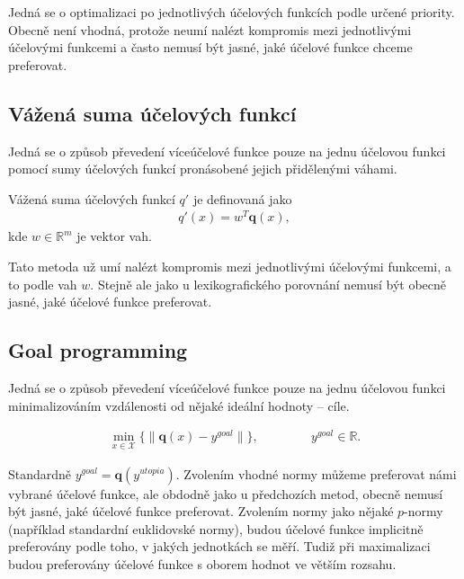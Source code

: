 Jedná se o optimalizaci po jednotlivých účelových funkcích podle určené priority. 
Obecně není vhodná, protože neumí nalézt kompromis mezi jednotlivými účelovými funkcemi a často nemusí být jasné, jaké účelové funkce chceme preferovat.

\subsection{Vážená suma účelových funkcí}\label{kap:vazenaSumaUcelF}

Jedná se o způsob převedení víceúčelové funkce pouze na jednu účelovou funkci pomocí sumy účelových funkcí pronásobené jejich přidělenými váhami.

\begin{definice}\label{df:vazenaSumaUcelF}
  Vážená suma účelových funkcí $q'$ je definovaná jako
  \begin{align*}
    q'(x) = w^T \mathbf{q}(x),
  \end{align*}
  kde $w \in \mathbb{R}^m$ je vektor vah.
\end{definice}

Tato metoda už umí nalézt kompromis mezi jednotlivými účelovými funkcemi, a to podle vah $w$.
Stejně ale jako u lexikografického porovnání nemusí být obecně jasné, jaké účelové funkce preferovat.

\subsection{Goal programming}\label{kap:goalP}

Jedná se o způsob převedení víceúčelové funkce pouze na jednu účelovou funkci minimalizováním vzdálenosti od nějaké ideální hodnoty -- cíle. 

\begin{definice}\label{df:goalP}
  \begin{align*}
    \min_{x \in \mathcal{X}} \{ \| \mathbf{q}(x) - y^{goal} \| \}, \hspace{50pt} y^{goal} \in \mathbb{R}.
  \end{align*}
\end{definice}

Standardně $y^{goal} = \mathbf{q}(y^{utopia})$.
Zvolením vhodné normy můžeme preferovat námi vybrané účelové funkce, ale obdodně jako u předchozích metod, obecně nemusí být jasné, jaké účelové funkce preferovat.
Zvolením normy jako nějaké $p$-normy (například standardní euklidovské normy), budou účelové funkce implicitně preferovány podle toho,
v jakých jednotkách se měří. Tudiž při maximalizaci budou preferovány účelové funkce s oborem hodnot ve větším rozsahu.

